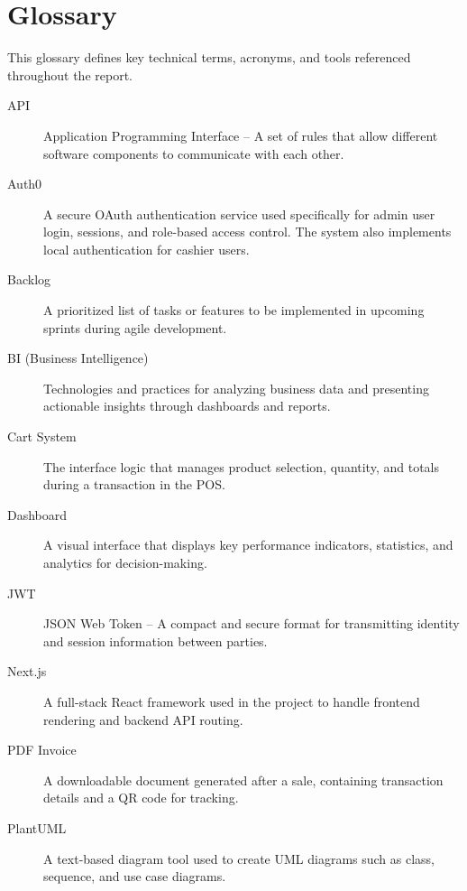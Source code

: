 \chapter*{Glossary}

This glossary defines key technical terms, acronyms, and tools referenced throughout the report.

\vspace{1em}

\begin{description}

  \item[API] Application Programming Interface – A set of rules that allow different software components to communicate with each other.

  \item[Auth0] A secure OAuth authentication service used specifically for admin user login, sessions, and role-based access control. The system also implements local authentication for cashier users.

  \item[Backlog] A prioritized list of tasks or features to be implemented in upcoming sprints during agile development.

  \item[BI (Business Intelligence)] Technologies and practices for analyzing business data and presenting actionable insights through dashboards and reports.

  \item[Cart System] The interface logic that manages product selection, quantity, and totals during a transaction in the POS.

  \item[Dashboard] A visual interface that displays key performance indicators, statistics, and analytics for decision-making.

  \item[JWT] JSON Web Token – A compact and secure format for transmitting identity and session information between parties.

  \item[Next.js] A full-stack React framework used in the project to handle frontend rendering and backend API routing.

  \item[PDF Invoice] A downloadable document generated after a sale, containing transaction details and a QR code for tracking.

  \item[PlantUML] A text-based diagram tool used to create UML diagrams such as class, sequence, and use case diagrams.


\end{description}
